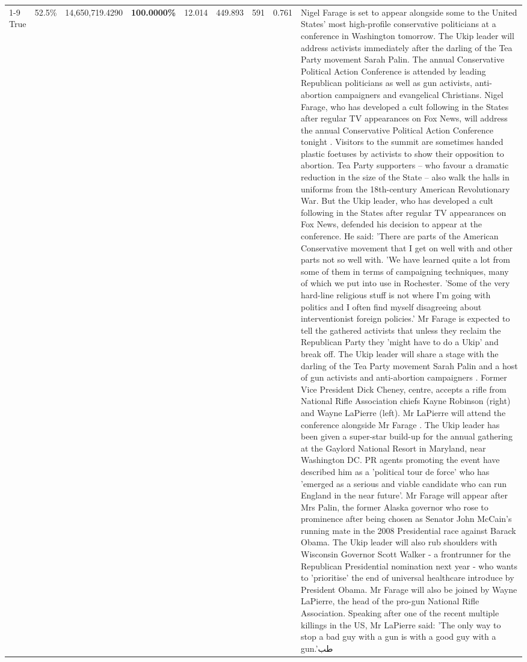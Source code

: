 \begin{table}[H]
\begin{tabular}{lllrlllll}
\cline{1-9}
True & 52.5\% & 14,650,719.4290 & \bfseries \color{red} 100.0000\% & 12.014 & 449.893 & 591 & 0.761 & Nigel Farage is set to appear alongside some to the United States' most high-profile conservative politicians at a conference in Washington tomorrow. The Ukip leader will address activists immediately after the darling of the Tea Party movement Sarah Palin. The annual Conservative Political Action Conference is attended by leading Republican politicians as well as gun activists, anti-abortion campaigners and evangelical Christians. Nigel Farage, who has developed a cult following in the States after regular TV appearances on Fox News, will address the annual Conservative Political Action Conference tonight . Visitors to the summit are sometimes handed plastic foetuses by activists to show their opposition to abortion. Tea Party supporters – who favour a dramatic reduction in the size of the State – also walk the halls in uniforms from the 18th-century American Revolutionary War. But the Ukip leader, who has developed a cult following in the States after regular TV appearances on Fox News, defended his decision to appear at the conference. He said: 'There are parts of the American Conservative movement that I get on well with and other parts not so well with. 'We have learned quite a lot from some of them in terms of campaigning techniques, many of which we put into use in Rochester. 'Some of the very hard-line religious stuff is not where I'm going with politics and I often find myself disagreeing about interventionist foreign policies.' Mr Farage is expected to tell the gathered activists that unless they reclaim the Republican Party they 'might have to do a Ukip' and break off. The Ukip leader will share a stage with the darling of the Tea Party movement Sarah Palin and a host of gun activists and anti-abortion campaigners . Former Vice President Dick Cheney, centre, accepts a rifle from National Rifle Association chiefs Kayne Robinson (right) and Wayne LaPierre (left). Mr LaPierre will attend the conference alongside Mr Farage . The Ukip leader has been given a super-star build-up for the annual gathering at the Gaylord National Resort in Maryland, near Washington DC. PR agents promoting the event have described him as a 'political tour de force' who has 'emerged as a serious and viable candidate who can run England in the near future'. Mr Farage will appear after Mrs Palin, the former Alaska governor who rose to prominence after being chosen as Senator John McCain's running mate in the 2008 Presidential race against Barack Obama. The Ukip leader will also rub shoulders with Wisconsin Governor Scott Walker - a frontrunner for the Republican Presidential nomination next year - who wants to 'prioritise' the end of universal healthcare introduce by President Obama. Mr Farage will also be joined by Wayne LaPierre, the head of the pro-gun National Rifle Association. Speaking after one of the recent multiple killings in the US, Mr LaPierre said: 'The only way to stop a bad guy with a gun is with a good guy with a gun.'طب \\

\end{tabular}
\end{table}

